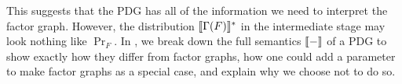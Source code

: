 \documentclass{article}
\DeclarePairedDelimiter{\UD}{\llbracket}{\rrbracket^*}
\numberwithin{equation}{section}
\begin{document}
	This suggests that the PDG has all of the information we need
        to interpret the factor graph. However, the
        distribution $\UD{\Gamma(F)}$ in the intermediate stage may
        look nothing like $\Pr_F$. In , we break
        down the full semantics $\llbracket-\rrbracket$ of a PDG to show exactly how
        they differ from factor graphs, how one could add a parameter
        to make factor graphs as a special case, and explain why we
        choose not to do so. 
	
	


	
%		
%		
\end{document}
